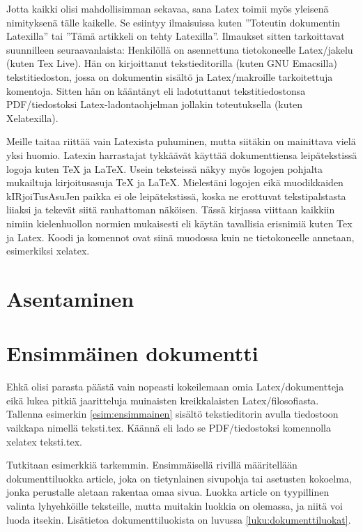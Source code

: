 \documentclass[a4paper,10pt,notitlepage,oneside]{book}
\newcommand{\koodi}[1]{\textsf{#1}}
\begin{document}
Jotta kaikki olisi mahdollisimman sekavaa, sana Latex toimii myös
yleisenä nimityksenä tälle kaikelle. Se esiintyy ilmaisuissa kuten
''Toteutin dokumentin Latexilla'' tai ''Tämä artikkeli on tehty
Latexilla''. Ilmaukset sitten tarkoittavat suunnilleen seuraavanlaista:
Henkilöllä on asennettuna tietokoneelle Latex\-/jakelu (kuten Tex Live).
Hän on kirjoittanut teksti\-editorilla (kuten GNU Emacsilla)
tekstitiedoston, jossa on dokumentin sisältö ja Latex\-/makroille
tarkoitettuja komentoja. Sitten hän on kääntänyt eli ladotuttanut
tekstitiedostonsa PDF\-/tiedostoksi Latex-la\-don\-ta\-oh\-jel\-man
jollakin toteutuksella (kuten Xelatexilla).

Meille \marginpar{\Large\LaTeX} taitaa riittää vain Latexista puhuminen,
mutta siitäkin on mainittava vielä yksi huomio. Latexin harrastajat
tykkäävät käyttää dokumenttiensa leipätekstissä logoja kuten \TeX{} ja
\LaTeX{}. Usein teksteissä näkyy myös logojen pohjalta mukailtuja
kirjoitus\-asuja TeX ja LaTeX. Mielestäni logojen eikä muodikkaiden
kIRjoiTus\-AsuJen paikka ei ole leipätekstissä, koska ne erottuvat
tekstipalstasta liiaksi ja tekevät siitä rauhattoman näköisen. Tässä
kirjassa viittaan kaikkiin nimiin kielenhuollon normien mukaisesti eli
käytän tavallisia erisnimiä kuten Tex ja Latex. Koodi ja komennot ovat
siinä muodossa kuin ne tietokoneelle annetaan, esimerkiksi
\koodi{xelatex}.

\section{Asentaminen}
\label{luku:asentaminen}

\section{Ensimmäinen dokumentti}

Ehkä olisi parasta päästä vain nopeasti kokeilemaan omia
Latex\-/dokumentteja eikä lukea pitkiä jaaritteluja muinaisten
kreikkalaisten Latex\-/filosofiasta. Tallenna esimerkin
\ref{esim:ensimmainen} sisältö teksti\-editorin avulla tiedostoon
vaikkapa nimellä teksti.tex. Käännä eli lado se PDF\-/tiedostoksi
komennolla \koodi{xelatex teksti.tex}.

Tutkitaan esimerkkiä tarkemmin. Ensimmäisellä rivillä määritellään
dokumenttiluokka \textenglish{article}, joka on tietynlainen sivupohja
tai asetusten kokoelma, jonka perustalle aletaan rakentaa omaa sivua.
Luokka \textenglish{article} on tyypillinen valinta lyhyehköille
teksteille, mutta muitakin luokkia on olemassa, ja niitä voi luoda
itsekin. Lisätietoa dokumenttiluokista on luvussa
\ref{luku:dokumenttiluokat}.
\end{document}
